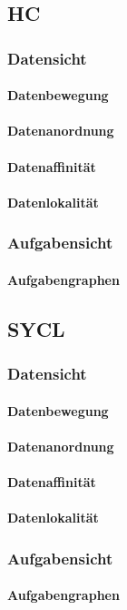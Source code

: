 \subsection{HC}

\subsubsection{Datensicht}

\paragraph{Datenbewegung}

\paragraph{Datenanordnung}

\paragraph{Datenaffinität}

\paragraph{Datenlokalität}

\subsubsection{Aufgabensicht}

\paragraph{Aufgabengraphen}

\subsection{SYCL}

\subsubsection{Datensicht}

\paragraph{Datenbewegung}

\paragraph{Datenanordnung}

\paragraph{Datenaffinität}

\paragraph{Datenlokalität}

\subsubsection{Aufgabensicht}

\paragraph{Aufgabengraphen}

